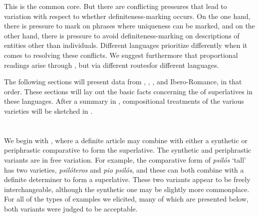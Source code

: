 \documentclass[output=paper
,modfonts
,nonflat]{langsci/langscibook}
\begin{document}
This is the common core. But there are conflicting pressures that lead to variation with respect to whether definiteness-marking occurs. On the one hand, there is pressure to mark  on phrases where uniqueness can be marked, and on the other hand, there is pressure to avoid definiteness-marking on descriptions of entities other than individuals. Different languages prioritize differently when it comes to resolving these conflicts. We suggest furthermore that proportional readings arise through , but via different routes\largerpage for different languages.

The following sections will present data from , , , and Ibero-Romance, in that order. These sections will lay out the basic facts concerning the  of superlatives in these languages. After a summary in , compositional treatments of the various varieties will be sketched in .

\section{} \label{sec:coppockstrand:2}

We begin with , where a definite article may combine with either a synthetic or periphrastic comparative to form the superlative. The
synthetic and periphrastic variants are in free variation. For example, the comparative form of \textit{psilós} `tall' has two varieties, \textit{psilóteros} and \textit{pio psilós}, and these can both combine with a definite determiner to form a superlative. These two variants appear to be freely interchangeable, although the synthetic one may be slightly more commonplace. For all of the types of examples we elicited, many of which are presented below, both variants were judged to be acceptable.
\end{document}
